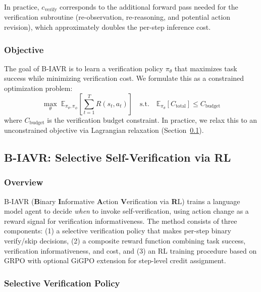 In practice, $c_{\text{verify}}$ corresponds to the additional forward pass needed for the verification subroutine (re-observation, re-reasoning, and potential action revision), which approximately doubles the per-step inference cost.

\subsubsection{Objective}

The goal of B-IAVR is to learn a verification policy $\pi_\theta$ that maximizes task success while minimizing verification cost. We formulate this as a constrained optimization problem:
\begin{equation}
\max_\theta \; \mathbb{E}_{\pi_\theta, \pi_\phi}\left[\sum_{t=1}^{T} R(s_t, a_t)\right] \quad \text{s.t.} \quad \mathbb{E}_{\pi_\theta}\left[C_{\text{total}}\right] \leq C_{\text{budget}}
\label{eq:objective}
\end{equation}
where $C_{\text{budget}}$ is the verification budget constraint. In practice, we relax this to an unconstrained objective via Lagrangian relaxation (Section~\ref{subsec:biavr}).


\subsection{B-IAVR: Selective Self-Verification via RL}
\label{subsec:biavr}

\subsubsection{Overview}

B-IAVR (\textbf{B}inary \textbf{I}nformative \textbf{A}ction \textbf{V}erification via \textbf{R}L) trains a language model agent to decide \textit{when} to invoke self-verification, using action change as a reward signal for verification informativeness. The method consists of three components: (1) a selective verification policy that makes per-step binary verify/skip decisions, (2) a composite reward function combining task success, verification informativeness, and cost, and (3) an RL training procedure based on GRPO with optional GiGPO extension for step-level credit assignment.

\subsubsection{Selective Verification Policy}


